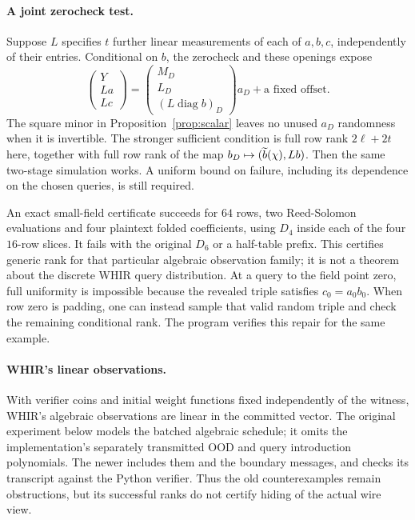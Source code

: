 \paragraph{A joint zerocheck test.} Suppose $L$ specifies $t$ further linear measurements of each of $a,b,c$, independently of their entries. Conditional on $b$, the zerocheck and these openings expose
\[
 \begin{pmatrix}Y\\La\\Lc\end{pmatrix}
 =
 \begin{pmatrix}M_D\\L_D\\(L\operatorname{diag}b)_D\end{pmatrix}a_D
 +\text{a fixed offset}.
\]
The square minor in Proposition~\ref{prop:scalar} leaves no unused $a_D$ randomness when it is invertible. The stronger sufficient condition is full row rank $2\ell+2t$ here, together with full row rank of the map $b_D\mapsto(\widetilde{b}(\chi),Lb)$. Then the same two-stage simulation works. A uniform bound on failure, including its dependence on the chosen queries, is still required.

An exact small-field certificate succeeds for $64$ rows, two Reed-Solomon evaluations and four plaintext folded coefficients, using $D_4$ inside each of the four $16$-row slices. It fails with the original $D_6$ or a half-table prefix. This certifies generic rank for that particular algebraic observation family; it is not a theorem about the discrete WHIR query distribution. At a query to the field point zero, full uniformity is impossible because the revealed triple satisfies $c_0=a_0b_0$. When row zero is padding, one can instead sample that valid random triple and check the remaining conditional rank. The program verifies this repair for the same example.

\paragraph{WHIR's linear observations.} With verifier coins and initial weight functions fixed independently of the witness, WHIR's algebraic observations are linear in the committed vector. The original experiment below models the batched algebraic schedule; it omits the implementation's separately transmitted OOD and query introduction polynomials. The newer  includes them and the boundary messages, and checks its transcript against the Python verifier. Thus the old counterexamples remain obstructions, but its successful ranks do not certify hiding of the actual wire view.

